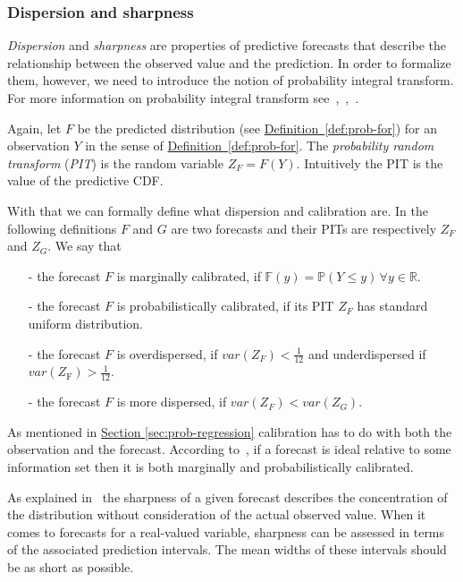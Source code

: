 \documentclass[12pt,a4paper,twoside]{scrartcl}
\numberwithin{equation}{section}
\newcommand{\refdef}[1]{\hyperref[#1]{Definition~\ref*{#1}}}
\newcommand{\refsec}[1]{\hyperref[#1]{Section \ref*{#1}}}
\begin{document}
\subsubsection{Dispersion and sharpness}\label{sec:disp-sharp}
\emph{Dispersion} and \emph{sharpness} are properties of predictive forecasts that describe the relationship between the observed value and the prediction. In order to formalize them, however, we need to introduce the notion of probability integral transform. For more information on probability integral transform see~\cite{diebold1998},~\cite{gneiting2007},~\cite{dawid84}.

Again, let \(F\) be the predicted distribution (see \refdef{def:prob-for}) for an observation \(Y\) in the sense of \refdef{def:prob-for}. The \emph{probability random transform} (\emph{PIT}) is the random variable \(Z_F=F(Y)\). Intuitively the PIT is the value of the predictive CDF.\@

With that we can formally define what dispersion and calibration are. In the following definitions \(F\) and \(G\) are two forecasts and their PITs are respectively \(Z_F\) and \(Z_G\). We say that
\begin{itemize}
\item[-] the forecast \(F\) is marginally calibrated, if \(\mathbb{F}(y) = \mathbb{P}(Y \leq y)\, \forall y\in\mathbb{R}\).
\item[-] the forecast \(F\) is probabilistically calibrated, if its PIT \(Z_F\) has standard uniform distribution.
\item[-] the forecast \(F\) is overdispersed, if \(var(Z_F) < \frac{1}{12}\) and underdispersed if \(var(Z_{\text{F}}) > \frac{1}{12} \).
\item[-] the forecast \(F\) is more dispersed, if \(var(Z_F) < var(Z_G)\).
\end{itemize}

As mentioned in \refsec{sec:prob-regression} calibration has to do with both the observation and the forecast. According to~\cite{gneiting2014}, if a forecast is ideal relative to some information set then it is both marginally and probabilistically calibrated.

As explained in~\cite{gneiting2014} the sharpness of a given forecast describes the concentration of the distribution without consideration of the actual observed value. When it comes to forecasts for a real-valued variable, sharpness can be assessed in terms of the associated prediction intervals. The mean widths of these intervals should be as short as possible. 
\end{document}
